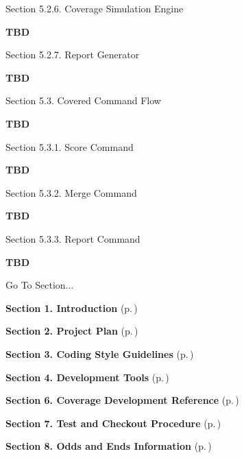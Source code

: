 \begin{Desc}
\item[Section 5.2.6.  Coverage Simulation Engine]\par
 {\bf TBD}\end{Desc}


\begin{Desc}
\item[Section 5.2.7.  Report Generator]\par
 {\bf TBD}\end{Desc}


\begin{Desc}
\item[Section 5.3.  Covered Command Flow]\par
 {\bf TBD}\end{Desc}
\begin{Desc}
\item[Section 5.3.1.  Score Command]\par
 {\bf TBD}\end{Desc}


\begin{Desc}
\item[Section 5.3.2.  Merge Command]\par
 {\bf TBD}\end{Desc}


\begin{Desc}
\item[Section 5.3.3.  Report Command]\par
 {\bf TBD}\end{Desc}


\begin{Desc}
\item[Go To Section...]\par
\begin{CompactItemize}
\item 
{\bf Section 1.  Introduction} {\rm (p.\,\pageref{page_intro})}\item 
{\bf Section 2.  Project Plan} {\rm (p.\,\pageref{page_project_plan})}\item 
{\bf Section 3.  Coding Style Guidelines} {\rm (p.\,\pageref{page_code_style})}\item 
{\bf Section 4.  Development Tools} {\rm (p.\,\pageref{page_tools})}\item 
{\bf Section 6.  Coverage Development Reference} {\rm (p.\,\pageref{page_code_details})}\item 
{\bf Section 7.  Test and Checkout Procedure} {\rm (p.\,\pageref{page_testing})}\item 
{\bf Section 8.  Odds and Ends Information} {\rm (p.\,\pageref{page_misc})}\end{CompactItemize}
\end{Desc}
